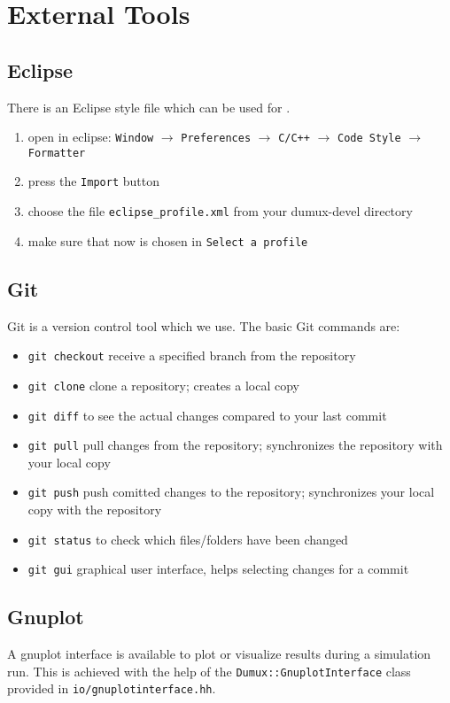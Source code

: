 \section{External Tools}
\label{sc_externaltools}

\subsection{Eclipse}
There is an Eclipse style file which can be used for \Dumux.
\begin{enumerate}
  \item open in eclipse: \texttt{Window} $\rightarrow$ \texttt{Preferences} $\rightarrow$
        \texttt{C/C++}  $\rightarrow$ \texttt{Code Style} $\rightarrow$ \texttt{Formatter}
  \item press the \texttt{Import} button
  \item choose the file \texttt{eclipse\_profile.xml} from your dumux-devel directory
  \item make sure that now \Dumux is chosen in \texttt{Select a profile}
\end{enumerate}


\subsection{Git}
Git is a version control tool which we use.
The basic Git commands are:
\begin{itemize}
  \item \texttt{git checkout} receive a specified branch from the repository
  \item \texttt{git clone} clone a repository; creates a local copy
  \item \texttt{git diff} to see the actual changes compared to your last commit
  \item \texttt{git pull} pull changes from the repository; synchronizes the
  repository with your local copy
  \item \texttt{git push} push comitted changes to the repository;  synchronizes
  your local copy with the repository
  \item \texttt{git status} to check which files/folders have been changed
  \item \texttt{git gui} graphical user interface, helps selecting changes for
  a commit
\end{itemize}


\subsection{Gnuplot}
\label{gnuplot}
A gnuplot interface is available to plot or visualize results during a simulation run.
This is achieved with the help of the \texttt{Dumux::GnuplotInterface} class provided in \texttt{io/gnuplotinterface.hh}.

